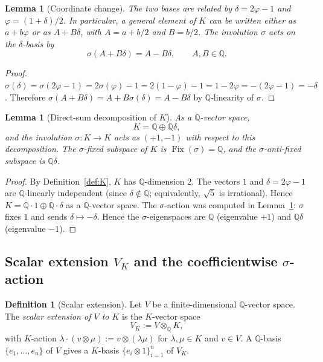 \documentclass[11pt, a4paper]{amsart}
\newtheorem{lemma}[theorem]{Lemma}
\theoremstyle{definition}
\newtheorem{definition}[theorem]{Definition}
\newcommand{\Q}{\mathbb{Q}}
\newcommand{\Fix}{\operatorname{Fix}}
\begin{document}
\begin{lemma}[Coordinate change]
\label{lem:coord-change}
The two bases are related by $\delta = 2\varphi - 1$ and $\varphi
= (1 + \delta)/2$. In particular, a general element of $K$ can be
written either as $a + b\varphi$ or as $A + B\delta$, with $A =
a + b/2$ and $B = b/2$. The involution $\sigma$ acts on the
$\delta$-basis by
\[
  \sigma(A + B\delta) = A - B\delta,
  \qquad A, B \in \Q.
\]
\end{lemma}

\begin{proof}
$\sigma(\delta) = \sigma(2\varphi - 1) = 2\sigma(\varphi) - 1 =
2(1-\varphi) - 1 = 1 - 2\varphi = -(2\varphi - 1) = -\delta$.
Therefore $\sigma(A + B\delta) = A + B\sigma(\delta) = A - B\delta$
by $\Q$-linearity of $\sigma$.
\end{proof}

\begin{lemma}[Direct-sum decomposition of $K$]
\label{lem:K-decomp}
As a $\Q$-vector space,
\[
  K = \Q \oplus \Q\delta,
\]
and the involution $\sigma \colon K \to K$ acts as $(+1, -1)$ with
respect to this decomposition. The $\sigma$-fixed subspace of $K$
is $\Fix(\sigma) = \Q$, and the $\sigma$-anti-fixed subspace is
$\Q\delta$.
\end{lemma}

\begin{proof}
By Definition~\ref{def:K}, $K$ has $\Q$-dimension $2$. The vectors
$1$ and $\delta = 2\varphi - 1$ are $\Q$-linearly independent
(since $\delta \notin \Q$; equivalently, $\sqrt{5}$ is irrational).
Hence $K = \Q \cdot 1 \oplus \Q \cdot \delta$ as a $\Q$-vector space.
The $\sigma$-action was computed in Lemma~\ref{lem:coord-change}:
$\sigma$ fixes $1$ and sends $\delta \mapsto -\delta$.
Hence the $\sigma$-eigenspaces are $\Q$ (eigenvalue $+1$) and
$\Q\delta$ (eigenvalue $-1$).
\end{proof}

\subsection{Scalar extension $V_K$ and the coefficientwise $\sigma$-action}

\begin{definition}[Scalar extension]
\label{def:VK}
Let $V$ be a finite-dimensional $\Q$-vector space. The
\emph{scalar extension of $V$ to $K$} is the $K$-vector space
\[
  V_K := V \otimes_\Q K,
\]
with $K$-action $\lambda \cdot (v \otimes \mu) := v \otimes
(\lambda \mu)$ for $\lambda, \mu \in K$ and $v \in V$. A
$\Q$-basis $\{e_1, \ldots, e_n\}$ of $V$ gives a $K$-basis
$\{e_i \otimes 1\}_{i=1}^n$ of $V_K$.
\end{definition}
\end{document}
